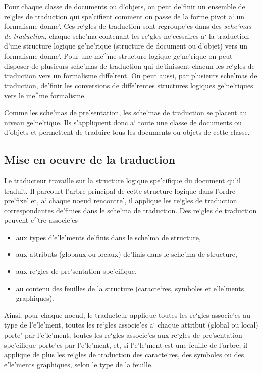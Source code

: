 {Pour chaque classe de documents ou d'objets, on peut de'finir un ensemble
de re`gles de traduction qui spe'cifient comment on passe de la forme pivot
a` un formalisme donne'. Ces re`gles de traduction sont regroupe'es dans des
{\em sche'mas de traduction}, chaque sche'ma contenant les re`gles
ne'cessaires a` la traduction d'une structure logique ge'ne'rique (structure
de document ou d'objet) vers un formalisme donne'. Pour une me^me structure
logique ge'ne'rique on peut disposer de plusieurs sche'mas de traduction qui
de'finissent chacun les re`gles de traduction vers un formalisme diffe'rent.
On peut aussi, par plusieurs sche'mas de traduction, de'finir les conversions
de diffe'rentes structures logiques ge'ne'riques vers le me^me formalisme.

Comme les sche'mas de pre'sentation, les sche'mas de traduction se placent au
niveau ge'ne'rique. Ils s'appliquent donc a` toute une classe de documents ou
d'objets et permettent de traduire tous les documents ou objets de cette
classe.

\subsection{Mise en oeuvre de la traduction}

Le traducteur travaille sur la structure logique spe'cifique du document
qu'il traduit. Il parcourt l'arbre principal de cette structure logique dans
l'ordre pre'fixe' et, a`
chaque noeud rencontre', il applique les re`gles de traduction correspondantes
de'finies dans le sche'ma de traduction. Des re`gles de traduction peuvent
e^tre associe'es
\begin{itemize}
\item aux types d'e'le'ments de'finis dans le sche'ma de structure,
\item aux attributs (globaux ou locaux) de'finis dans le sche'ma de structure,
\item aux re`gles de pre'sentation spe'cifique,
\item au contenu des feuilles de la structure (caracte`res, symboles et
 e'le'ments graphiques).
\end{itemize}
Ainsi, pour chaque noeud, le traducteur applique toutes les re`gles
associe'es au type de l'e'le'ment, toutes les re`gles associe'es a` chaque
attribut (global ou local) porte' par l'e'le'ment,
toutes les re`gles associe'es aux re`gles de pre'sentation spe'cifique
porte'es par l'e'le'ment,
et, si l'e'le'ment est une
feuille de l'arbre, il applique de plus les re`gles de traduction des
caracte`res, des symboles ou des e'le'ments graphiques, selon le type de la
feuille.

}
